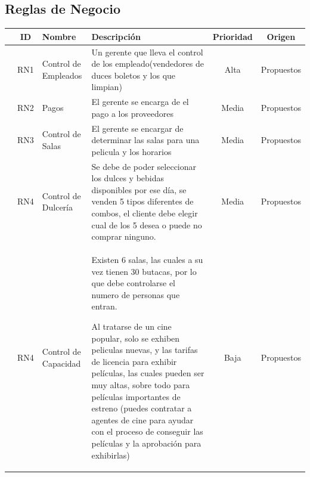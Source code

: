 \documentclass[12pt, fleqn]{report}                             %
\begin{document}
        \subsection{Reglas de Negocio}

            \begin{tabular}{r ||c |m{7em} | m{15em} |c |c }
               &  ID & Nombre & Descripción & Prioridad & Origen \\ [0.5ex] 
               \hline\hline
              
                & RN1   & Control de Empleados                  &
                Un gerente que lleva el control de los empleado(vendedores de duces boletos y los que limpian)
                & Alta  & Propuestos\\

                & RN2   & Pagos                                 &
                El gerente se encarga de el pago a los proveedores
                & Media  & Propuestos\\

                & RN3   & Control de Salas                      &
                El gerente se encargar de determinar las salas para una pelicula y los horarios
                & Media  & Propuestos\\


                & RN4   & Control de Dulcería                   &
                Se debe de poder seleccionar los dulces y bebidas disponibles por ese día, 
                se venden 5 tipos diferentes de combos, el cliente debe elegir cual de los
                5 desea o puede no comprar ninguno.
                & Media  & Propuestos\\

                & RN4   & Control de Capacidad                   &
                Existen 6 salas, las cuales a su vez tienen 30 butacas, por lo que debe controlarse el numero
                de personas que entran.

                Al tratarse de un cine popular, solo se exhiben peliculas nuevas, y las tarifas de licencia
                para exhibir películas, las cuales pueden ser muy altas, sobre todo para películas importantes
                de estreno (puedes contratar a agentes de cine para ayudar con el proceso de conseguir las
                películas y la aprobación para exhibirlas)
                & Baja  & Propuestos\\

            \end{tabular}
\end{document}

